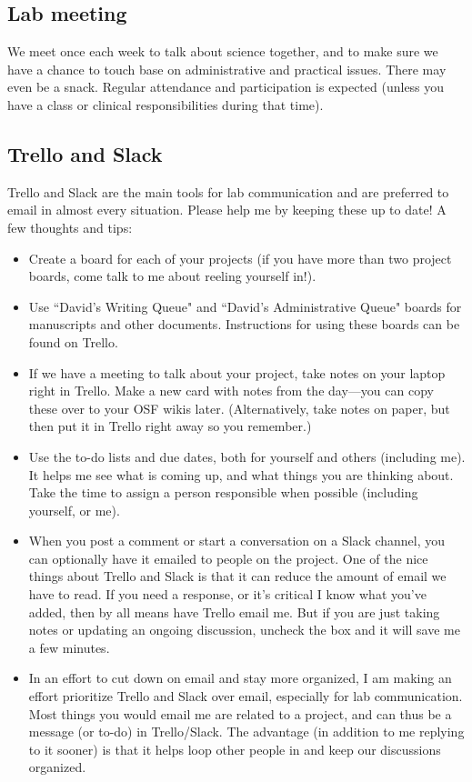 \documentclass[letterpaper,12pt,oneside]{memoir}
\begin{document}
\subsection{Lab meeting}
We meet once each week to talk about science together, and to make sure we have a chance to touch base on administrative and practical issues. There may even be a snack. Regular attendance and participation is expected (unless you have a class or clinical responsibilities during that time).


\subsection{Trello and Slack}
Trello and Slack are the main tools for lab communication and are preferred to email in almost every situation. Please help me by keeping these up to date! A few thoughts and tips:

\begin{itemize}
\item Create a board for each of your projects (if you have more than two project boards, come talk to me about reeling yourself in!).

\item Use ``David's Writing Queue" and ``David's Administrative Queue" boards for manuscripts and other documents. Instructions for using these boards can be found on Trello.

\item If we have a meeting to talk about your project, take notes on your laptop right in Trello. Make a new card with notes from the day---you can copy these over to your OSF wikis later. (Alternatively, take notes on paper, but then put it in Trello right away so you remember.)

\item Use the to-do lists and due dates, both for yourself and others (including me). It helps me see what is coming up, and what things you are thinking about. Take the time to assign a person responsible when possible (including yourself, or me).

\item When you post a comment or start a conversation on a Slack channel, you can optionally have it emailed to people on the project. One of the nice things about Trello and Slack is that it can reduce the amount of email we have to read. If you need a response, or it's critical I know what you've added, then by all means have Trello email me. But if you are just taking notes or updating an ongoing discussion, uncheck the box and it will save me a few minutes.

\item In an effort to cut down on email and stay more organized, I am making an effort prioritize Trello and Slack over email, especially for lab communication. Most things you would email me are related to a project, and can thus be a message (or to-do) in Trello/Slack. The advantage (in addition to me replying to it sooner) is that it helps loop other people in and keep our discussions organized. 

\end{itemize}
\end{document}
